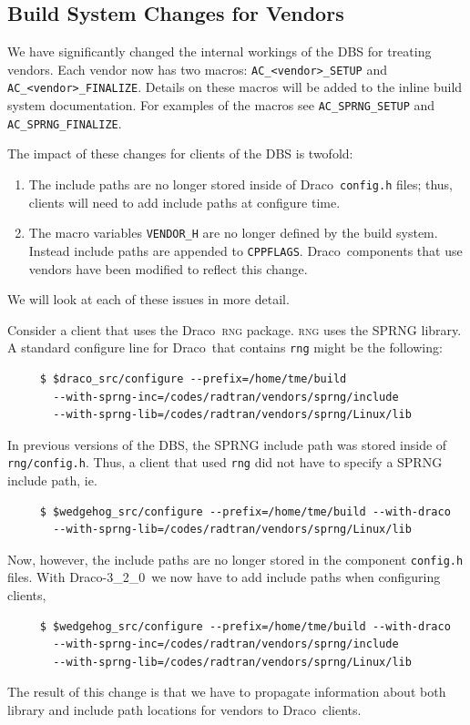 \documentclass[11pt]{nmemo}
\newcommand{\draco}{Draco}
\newcommand{\dracor}{\draco-3\_2\_0}
\begin{document}
\subsection{Build System Changes for Vendors}

We have significantly changed the internal workings of the DBS for
treating vendors.  Each vendor now has two macros:
\texttt{AC\_<vendor>\_SETUP} and \texttt{AC\_<vendor>\_FINALIZE}.
Details on these macros will be added to the inline build system
documentation.  For examples of the macros see \texttt{AC\_SPRNG\_SETUP}
and \texttt{AC\_SPRNG\_FINALIZE}.  

The impact of these changes for clients of the DBS is twofold:
\begin{enumerate}
\item The include paths are no longer stored inside of \draco\
  \texttt{config.h} files; thus, clients will need to add include
  paths at configure time.
\item The macro variables \texttt{VENDOR\_H} are no longer defined by
  the build system.  Instead include paths are appended to
  \texttt{CPPFLAGS}.  \draco\ components that use vendors have been
  modified to reflect this change.
\end{enumerate}
We will look at each of these issues in more detail.

Consider a client that uses the \draco\ \textsc{rng} package.
\textsc{rng} uses the SPRNG library.  A standard configure line for
\draco\ that contains \texttt{rng} might be the following:
\begin{verbatim}
     $ $draco_src/configure --prefix=/home/tme/build 
       --with-sprng-inc=/codes/radtran/vendors/sprng/include
       --with-sprng-lib=/codes/radtran/vendors/sprng/Linux/lib
\end{verbatim}
In previous versions of the DBS, the SPRNG include path was stored
inside of \texttt{rng/config.h}.  Thus, a client that used
\texttt{rng} did not have to specify a SPRNG include path, ie.
\begin{verbatim}
     $ $wedgehog_src/configure --prefix=/home/tme/build --with-draco
       --with-sprng-lib=/codes/radtran/vendors/sprng/Linux/lib
\end{verbatim}
Now, however, the include paths are no longer stored in the component
\texttt{config.h} files.  With \dracor\ we now have to add include
paths when configuring clients,
\begin{verbatim}
     $ $wedgehog_src/configure --prefix=/home/tme/build --with-draco
       --with-sprng-inc=/codes/radtran/vendors/sprng/include
       --with-sprng-lib=/codes/radtran/vendors/sprng/Linux/lib
\end{verbatim}
The result of this change is that we have to propagate information
about both library and include path locations for vendors to \draco\
clients. 
\end{document}
